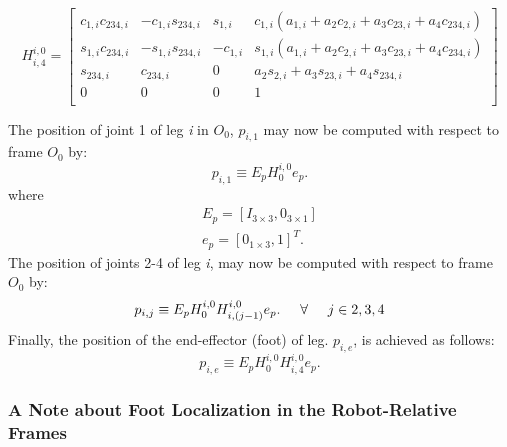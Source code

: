 				\begin{equation}
					H^{i,0}_{i,4} =\left[ 
					\begin{array}{ccc|c}
						c_{1,i} c_{234,i}	&  		-c_{1,i} s_{234,i}	& 		s_{1,i}		&		c_{1,i}( a_{1,i} + a_2 c_{2,i} + a_3 c_{23,i} + a_4 c_{234,i} )		\\
						s_{1,i} c_{234,i}	&  		-s_{1,i} s_{234,i}	& 		-c_{1,i}	&		s_{1,i}( a_{1,i} + a_2 c_{2,i} + a_3 c_{23,i} + a_4 c_{234,i} )		\\
						s_{234,i} 		&  		c_{234,i}		& 		0			&		a_2 s_{2,i} + a_3 s_{23,i} + a_4 s_{234,i}					\\ \hline
						0 			& 		0			& 		0			&		1 															\\
					\end{array} 
					\right]
				\end{equation}

			\noindent
			The position of joint 1 of leg \emph{i} in $O_{0}$, ${p}_{i,1}$ may now be computed with respect to frame $O_{0}$ by:
				\begin{equation}
					{p}_{i,1} \equiv E_{p} H_{0}^{i,0} e_{p}.
				\end{equation}
			where
				\begin{eqnarray}
					E_{p} = [I_{3\times3},0_{3\times1}]	\nonumber 	\\
					e_{p} = [0_{1\times3},1]^T.			\nonumber 	
				\end{eqnarray}
			The position of joints 2-4 of leg \emph{i}, may now be computed with respect to frame $O_{0}$ by:
				\begin{equation}
					{p}_{i,j} \equiv E_{p} H_{0}^{i,0} {H}^{i,0}_{i,(j-1)} e_{p}. \hspace{5mm} \forall \hspace{5mm} j\in{2,3,4}
					\label{eq::world_joint_positions}
				\end{equation}
			Finally, the position of the end-effector (foot) of \Ith leg. ${p}_{i,e}$, is achieved as follows:
				\begin{equation}
					{p}_{i,e} \equiv E_{p} H_{0}^{i,0} {H}^{i,0}_{i,4} e_{p}.
					\label{eq::world_feet_positions}
				\end{equation}

			\subsubsection{A Note about Foot Localization in the Robot-Relative Frames}

